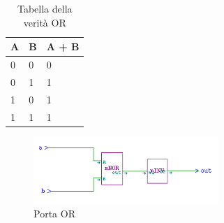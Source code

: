\documentclass[10pt]{article}
\begin{document}
\begin{itemize}
    \begin{table}[H]
        \begin{minipage}[b]{\textwidth}
        \centering
        \begin{tabular}{|ll|l|}
            \hline
            \textbf{A} & \textbf{B} & \textbf{A + B} \\ \hline
            0          & 0          & 0              \\ \hline
            0          & 1          & 1              \\ 
            1          & 0          & 1              \\ 
            1          & 1          & 1              \\ \hline
            \end{tabular}
            \caption{Tabella della verità OR}
            \label{table:student}
        \end{minipage}
        \end{table}
        
        \begin{figure}[H]
        \begin{minipage}[b]{\textwidth}
        
        \includegraphics[width=70mm]{or}
        \caption{Porta OR}
        \label{ }
        \end{minipage}
        \end{figure}


\end{itemize}
\end{document}

